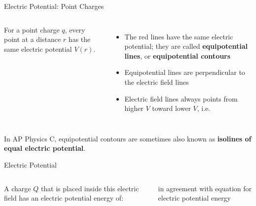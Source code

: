 \documentclass[12pt,aspectratio=169]{beamer}
\begin{document}
\begin{frame}{Electric Potential: Point Charges}
  \begin{columns}
    \centering
 
    For a point charge $q$, every point at a distance $r$ has the same
    electric potential $V(r)$.
    \begin{itemize}
    \item The red lines have the same electric potential; they are called
      \textbf{equipotential lines}, or \textbf{equipotential contours}
    \item Equipotential lines are perpendicular to the electric field lines
    \item Electric field lines always points from higher $V$ toward lower $V$,
      i.e.

    \end{itemize}
  \end{columns}
  \vspace{.1in}In AP Physics C, equipotential contours are sometimes also known
  as \textbf{isolines of equal electric potential}.
\end{frame}



\begin{frame}{Electric Potential}
  \begin{columns}
    \centering
    
    A charge $Q$ that is placed inside this electric field has an electric
    potential energy of:


    in agreement with equation for electric potential energy
  \end{columns}
\end{frame}
\end{document}
